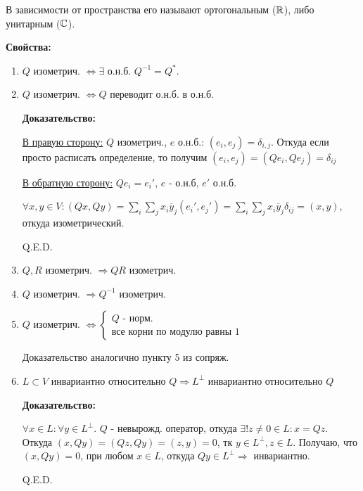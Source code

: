 В зависимости от пространства его называют ортогональным ($\mathbb{R}$), либо унитарным ($\mathbb{C}$).

\textbf{Свойства:}

\begin{enumerate}
    \item $Q$ изометрич. $\Leftrightarrow \exists $ о.н.б. $Q^{-1}=Q^*$.
    \item $Q$ изометрич. $\Leftrightarrow Q$ переводит о.н.б. в о.н.б.
    
    \textbf{Доказательство:}

    \uline{В правую сторону:} $Q$ изометрич., $e$ о.н.б.: $(e_i,e_j) = \delta_{i,j}$. Откуда если просто расписать определение, то получим $(e_i,e_j) = (Q e_i,Qe_j) = \delta_{ij}$

    \uline{В обратную сторону:} $Qe_i = e_i'$, $e$ - о.н.б, $e'$ о.н.б.

    $\forall x,y \in V: (Qx,Qy) = \sum\limits_{i}\sum\limits_{j}x_i\overline{y}_j (e_i',e_j') = \sum\limits_{i}\sum\limits_{j}x_i\overline{y}_j \delta_{ij}= (x,y)$, откуда изометрический.

    \hfill Q.E.D.

    \item $Q,R$ изометрич. $\Rightarrow QR$ изометрич.
    \item $Q$ изометрич. $\Rightarrow Q^{-1}$ изометрич.
    \item $Q$ изометрич. $\Leftrightarrow \begin{cases}
        Q \text{ - норм.}\\
        \text{все корни по модулю равны 1}
    \end{cases}$

    Доказательство аналогично пункту 5 из сопряж.
    \item  $L \subset V$ инвариантно относительно $Q \Rightarrow L^\perp$ инвариантно относительно $Q$

    \textbf{Доказательство:}

    $\forall x\in L: \forall y \in L^\perp$. $Q$ - невырожд. оператор, откуда $\exists! z\neq 0 \in L:x = Qz$. Откуда $(x, Qy) = (Qz, Qy ) = (z,y) = 0$, тк $y \in L^\perp, z \in L$. Получаю, что $(x,Qy) = 0$, при любом $x\in L$, откуда $Qy \in L^\perp \Rightarrow$ инвариантно. 

    

    \hfill Q.E.D.    
\end{enumerate}

